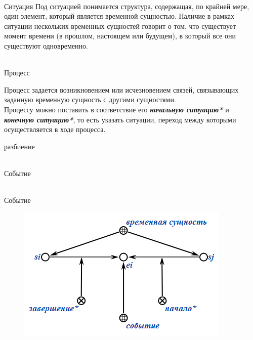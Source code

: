 \begin{frame}{\\Ситуация}
	\topline
	\justifying
	Под ситуацией понимается структура, содержащая, по крайней мере, один элемент, который является временной
	сущностью. Наличие в рамках ситуации нескольких временных сущностей говорит о том, что существует момент	времени (в прошлом, настоящем или будущем), в который все они существуют одновременно.
\end{frame}

\begin{frame}{\\Процесс}
	\topline
	\justifying
	
	\vspace{10mm}
	Процесс задается возникновением или исчезновением связей, связывающих заданную временную сущность с другими сущностями.\\
	Процессу можно поставить в соответствие его \textbf{\textit{начальную ситуацию*}} и \textbf{\textit{конечную ситуацию*}}, то есть указать ситуации, переход между которыми осуществляется в ходе процесса.
	\begin{scnrelfromset}{разбиение}
	\end{scnrelfromset}
\end{frame}

\begin{frame}{\\Событие}
	\topline
	\justifying
\end{frame}

\begin{frame}{\\Событие}
	\topline
	\justifying
	\vspace{10mm}
	\begin{SCn}
		\begin{figure}[H]
			\includegraphics[scale=0.8]{./figures/sd_temp_entities/event.png}
		\end{figure}
	\end{SCn}
\end{frame}

